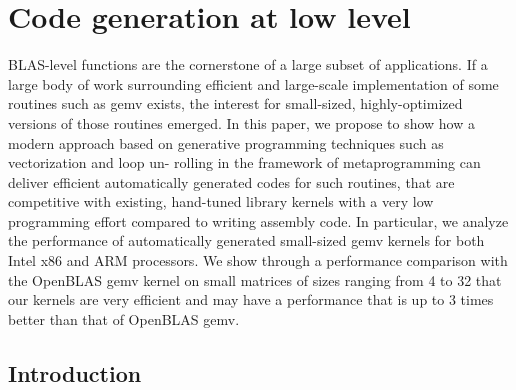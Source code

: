 \documentclass[../../main.tex]{subfiles}
\begin{document}
\chapter{Code generation at low level}


BLAS-level functions are the cornerstone of a large
subset of applications. If a large body of work surrounding
efficient and large-scale implementation of some routines such
as gemv exists, the interest for small-sized, highly-optimized
versions of those routines emerged. In this paper, we propose
to show how a modern \cpp approach based on generative
programming techniques such as vectorization and loop un-
rolling in the framework of metaprogramming can deliver
efficient automatically generated codes for such routines, that
are competitive with existing, hand-tuned library kernels with
a very low programming effort compared to writing assembly
code. In particular, we analyze the performance of automatically
generated small-sized gemv kernels for both Intel x86 and ARM
processors. We show through a performance comparison with
the OpenBLAS gemv kernel on small matrices of sizes ranging
from 4 to 32 that our \cpp kernels are very efficient and may
have a performance that is up to 3 times better than that of
OpenBLAS gemv.

\section{Introduction}
\end{document}
